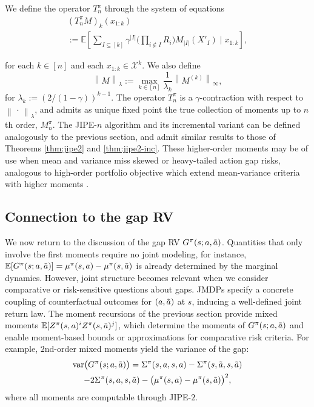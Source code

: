 \documentclass[accepted]{uai2026}
\theoremstyle{plain}
\theoremstyle{definition}
\theoremstyle{remark}
\newcommand{\X}{\mathcal{X}}
\newcommand{\E}{\mathbb{E}}
\newcommand{\LVert}{\left\lVert}
\newcommand{\RVert}{\right\rVert}
\newcommand{\1}{\mathbbm{1}}
\newcommand{\norm}[1]{\left\lVert #1\right\rVert}
\newcommand{\abs}[1]{\left\lvert #1\right\rvert}
\begin{document}
We define the operator $T^\pi_n$ through the system of equations
\begin{equation}
\begin{gathered}
(T^\pi_n M)_k(x_{1:k}) \\:= \E \left[\sum_{I \subseteq [k]} \gamma^{\abs{I}} \big( \prod_{i\notin I} R_i\big) M_{\abs{I}}(X'_I) \mid x_{1:k} \right],
\end{gathered}
\end{equation}

for each $k \in [n]$ and each $x_{1:k} \in \X^k$. We also define
\begin{equation}
\LVert M\RVert_\lambda := \max_{k \in [n]}\frac{1}{\lambda_k} \LVert M^{(k)}\RVert_\infty,
\end{equation}
for $\lambda_k := (2/(1-\gamma))^{k-1}$. The operator $T^\pi_n$ is a $\gamma$-contraction with respect to $\norm{\,\cdot\,}_\lambda$, and admits as unique fixed point the true collection of moments up to $n$th order, $M^\pi_n$. The JIPE-$n$ algorithm and its incremental variant can be defined analogously to the previous section, and admit similar results to those of Theorems \ref{thm:jipe2} and \ref{thm:jipe2-inc}. These higher-order moments may be of use when mean and variance miss skewed or heavy-tailed action gap risks, analogous to high-order portfolio objective which extend mean-variance criteria with higher moments \citep{mvsk}.

\subsection{Connection to the gap RV}

We now return to the discussion of the gap RV $G^\pi(s; a, \Tilde{a})$. Quantities that only involve the first moments require no joint modeling, for instance, $\E[G^\pi(s; a, \Tilde{a})] = \mu^\pi(s, a) - \mu^\pi(s, \Tilde{a})$ is already determined by the marginal dynamics. However, joint structure becomes relevant when we consider comparative or risk-sensitive questions about gaps. JMDPs specify a concrete coupling of counterfactual outcomes for $(a, \Tilde{a})$ at $s$, inducing a well-defined joint return law. The moment recursions of the previous section provide mixed moments $\E[Z^\pi(s, a)^i Z^\pi(s,\Tilde{a})^j]$, which determine the moments of $G^\pi(s; a, \Tilde{a})$ and enable moment-based bounds or approximations for comparative risk criteria. For example, $2$nd-order mixed moments yield the variance of the gap:
\begin{equation}
\begin{gathered}
\mathrm{var}\big(G^\pi(s;a,\Tilde{a})\big) = \Sigma^\pi(s,a,s,a) - \Sigma^\pi(s,\Tilde{a},s,\Tilde{a}) \\- 2\Sigma^\pi(s,a,s,\Tilde{a}) - \big(\mu^\pi(s, a) - \mu^\pi(s, \Tilde{a}) \big)^2,
\end{gathered}
\end{equation}
where all moments are computable through JIPE-$2$.
\end{document}
